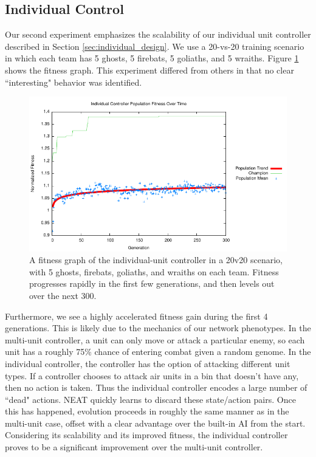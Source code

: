 \documentclass[a4paper]{article}
\begin{document}
\subsection{Individual Control}

Our second experiment emphasizes the scalability of our individual unit controller described in Section \ref{sec:individual_design}. We use a 20-vs-20 training scenario in which each team has 5 ghosts, 5 firebats, 5 goliaths, and 5 wraiths. Figure \ref{fig:individual_exp} shows the fitness graph. This experiment differed from others in that no clear ``interesting" behavior was identified.

\begin{figure}
\centering
\includegraphics[scale=1.1]{plots/individual.pdf}
\caption{A fitness graph of the individual-unit controller in a 20v20 scenario, with 5 ghosts, firebats, goliaths, and wraiths on each team. Fitness progresses rapidly in the first few generations, and then levels out over the next 300.}
\label{fig:individual_exp}
\end{figure}

Furthermore, we see a highly accelerated fitness gain during the first 4 generations. This is likely due to the mechanics of our network phenotypes. In the multi-unit controller, a unit can only move or attack a particular enemy, so each unit has a roughly 75\% chance of entering combat given a random genome. In the individual controller, the controller has the option of attacking different unit types. If a controller chooses to attack air units in a bin that doesn't have any, then no action is taken. Thus the individual controller encodes a large number of ``dead" actions. NEAT quickly learns to discard these state/action pairs. Once this has happened, evolution proceeds in roughly the same manner as in the multi-unit case, offset with a clear advantage over the built-in AI from the start. Considering its scalability and its improved fitness, the individual controller proves to be a significant improvement over the multi-unit controller.
\end{document}
